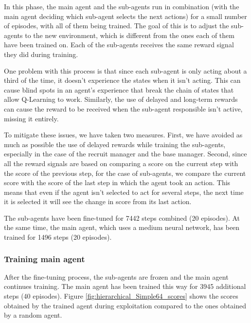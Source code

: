 In this phase, the main agent and the sub-agents run in combination (with the main agent deciding which sub-agent selects the next actions) for a small number of episodes, with all of them being trained. The goal of this is to adjust the sub-agents to the new environment, which is different from the ones each of them have been trained on. Each of the sub-agents receives the same reward signal they did during training.

One problem with this process is that since each sub-agent is only acting about a third of the time, it doesn't experience the states when it isn't acting. This can cause blind spots in an agent's experience that break the chain of states that allow Q-Learning to work. Similarly, the use of delayed and long-term rewards can cause the reward to be received when the sub-agent responsible isn't active, missing it entirely.

To mitigate these issues, we have taken two measures. First, we have avoided as much as possible the use of delayed rewards while training the sub-agents, especially in the case of the recruit manager and the base manager. Second, since all the reward signals are based on comparing a score on the current step with the score of the previous step, for the case of sub-agents, we compare the current score with the score of the last step in which the agent took an action. This means that even if the agent isn't selected to act for several steps, the next time it is selected it will see the change in score from its last action.

The sub-agents have been fine-tuned for 7442 steps combined (20 episodes). At the same time, the main agent, which uses a medium neural network, has been trained for 1496 steps (20 episodes).

\subsubsection*{Training main agent}

After the fine-tuning process, the sub-agents are frozen and the main agent continues training. The main agent has been trained this way for 3945 additional steps (40 episodes). Figure \ref{fig:hierarchical_Simple64_scores} shows the scores obtained by the trained agent during exploitation compared to the ones obtained by a random agent.

